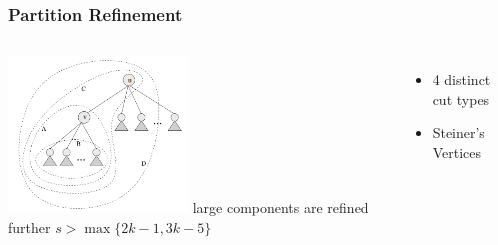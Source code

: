 \begin{frame}
  \frametitle{Partition Refinement}
  \begin{columns}
    \includegraphics[width=180px]{../images/graph-cuts.png}
  large components are refined further
  \color{red}\(s > \max\{2k-1,3k-5\}\)
  \begin{itemize}
    \item 4 distinct cut types
    \item  Steiner's Vertices\cite{aggarwal}
  \end{itemize}
  \end{columns}
\end{frame}